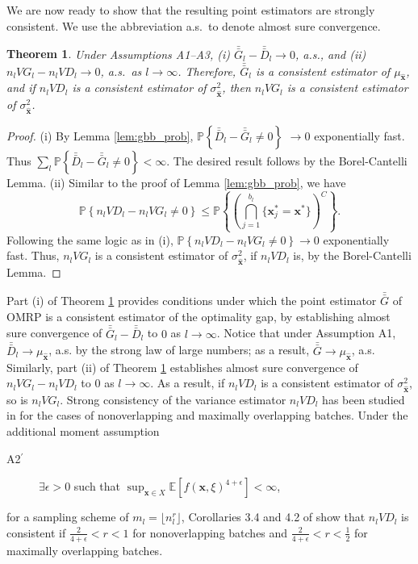 \documentclass[12pt]{article}
\newtheorem{theorem}{Theorem}
\newcommand{\p}[1]{\mathbb{P} \left\{ #1 \right\}}
\newcommand{\e}[1]{\mathbb{E} \left[ #1 \right]
}
\newcommand{\x}{\mathbf{x}}
\newcommand{\xh}{{\hat{\x}}}
\newcommand{\xs}{\x^*}
\newcommand{\nbl}{b_l}
\newcommand{\gb}{\bar{G}}
\newcommand{\gbb}{\bar{\gb}}
\newcommand{\db}{\bar{D}}
\newcommand{\dbb}{\bar{\db}}
\begin{document}
We are now ready to show that the resulting point estimators are strongly consistent. 
We use the abbreviation a.s.\ to denote almost sure convergence. 
 

\begin{theorem} \label{thm:strong_consistency}
	Under Assumptions A1--A3, (i) $\gbb_l - \dbb_l \rightarrow 0$, a.s., and (ii) $n_l VG_l - n_l VD_l \rightarrow 0$, a.s.\ as $l \rightarrow \infty$.  
        Therefore, $\gbb_l$ is a consistent estimator of $\mu_{\xh}$, and if $n_l VD_l$ is a consistent estimator of $\sigma^2_{\xh}$, then $n_l VG_l$ is a consistent estimator of $\sigma^2_{\xh}$.
\end{theorem}

\begin{proof}
	(i) By Lemma \ref{lem:gbb_prob}, $\p{\dbb_l - \gbb_l \neq 0}$ $\rightarrow 0$ exponentially fast.  
        Thus $\sum_l \p{\dbb_l - \gbb_l \neq 0} < \infty$.  
        The desired result follows by the Borel-Cantelli Lemma.
%
(ii) Similar to the proof of Lemma \ref{lem:gbb_prob}, we have
	\[
		\p{n_l VD_l -n_l VG_l \neq 0} \leq \p{\left( \bigcap_{j=1}^{\nbl} \{\xs_{j} = \xs\} \right)^C}.
	\]
	Following the same logic as in (i), $\p{n_l VD_l -n_l VG_l \neq 0} \rightarrow 0$ exponentially fast. 
Thus, $n_l VG_l$ is a consistent estimator of $\sigma^2_{\xh}$, if $n_l VD_l$ is, by the Borel-Cantelli Lemma.
\end{proof}

Part (i) of Theorem \ref{thm:strong_consistency} provides conditions under which the point estimator $\gbb$ of OMRP is a consistent estimator of the optimality gap, by establishing almost sure convergence of $\gbb_l - \dbb_l$ to $0$ as $l \rightarrow \infty$. 
Notice that under Assumption A1, $\dbb_l \rightarrow \mu_\xh$, a.s. by the strong law of large numbers; as a result, $\gbb \rightarrow \mu_\xh$, a.s. 
Similarly, part (ii) of Theorem \ref{thm:strong_consistency} establishes almost sure convergence of $n_l VG_l - n_l VD_l$ to $0$ as $l \rightarrow \infty$. 
As a result, if $n_l VD_l$ is a consistent estimator of $\sigma^2_{\xh}$, so is $n_l VG_l$.  
Strong consistency of the variance estimator $n_l VD_l$ has been studied in \cite{damerdji1994strong} for the cases of nonoverlapping and maximally overlapping batches.  
Under the additional moment assumption
\begin{description}
	\item[A2$^\prime$]  $\exists \epsilon > 0$ such that $\sup_{\x \in X} \e{f(\x,\xi)^{4+\epsilon}} < \infty$,
\end{description}
for a sampling scheme of $m_l = \lfloor n_l^r \rfloor$, Corollaries 3.4 and 4.2 of \cite{damerdji1994strong} show that $n_l VD_l$ is consistent if $\tfrac{2}{4+\epsilon} < r < 1$ for nonoverlapping batches and $\tfrac{2}{4+\epsilon} < r < \tfrac{1}{2}$ for maximally overlapping batches. 
\end{document}
